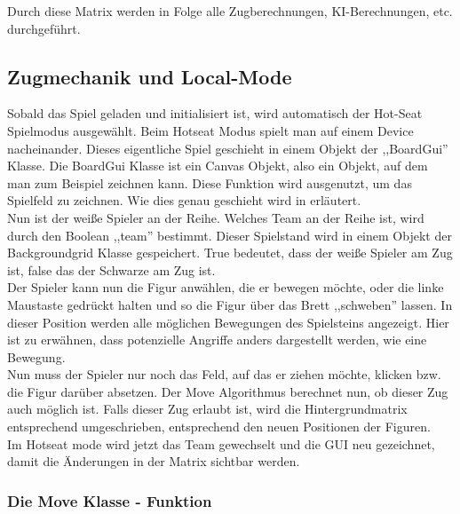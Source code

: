 \documentclass[12pt,a4paper]{article}
\begin{document}
{Durch diese Matrix werden in Folge alle Zugberechnungen, KI-Berechnungen, etc. durchgeführt. \\


\subsection{Zugmechanik und Local-Mode}
\label{SUBSEC:LOCAL_MODE}

Sobald das Spiel geladen und initialisiert ist, wird automatisch der Hot-Seat Spielmodus ausgewählt. Beim Hotseat Modus spielt man auf einem Device nacheinander. Dieses eigentliche Spiel geschieht in einem Objekt der ,,BoardGui'' Klasse. Die BoardGui Klasse ist ein Canvas Objekt, also ein Objekt, auf dem man zum Beispiel zeichnen kann. Diese Funktion wird ausgenutzt, um das Spielfeld zu zeichnen. Wie dies genau geschieht wird in \textbf{ %
 } 
erläutert.  \\
Nun ist der weiße Spieler an der Reihe. Welches Team an der Reihe ist, wird durch den Boolean ,,team'' bestimmt. Dieser Spielstand wird in einem Objekt der Backgroundgrid Klasse gespeichert. True bedeutet, dass der weiße Spieler am Zug ist, false das der Schwarze am Zug ist. \\
Der Spieler kann nun die Figur anwählen, die er bewegen möchte, oder die linke Maustaste gedrückt halten und so die Figur über das Brett ,,schweben'' lassen. In dieser Position werden alle möglichen Bewegungen des Spielsteins angezeigt. Hier ist zu erwähnen, dass potenzielle Angriffe anders dargestellt werden, wie eine Bewegung. \\
Nun muss der Spieler nur noch das Feld, auf das er ziehen möchte, klicken bzw. die Figur darüber absetzen. Der Move Algorithmus berechnet nun, ob dieser Zug auch möglich ist. Falls dieser Zug erlaubt ist, wird die Hintergrundmatrix entsprechend umgeschrieben, entsprechend den neuen Positionen der Figuren. \\
Im Hotseat mode wird jetzt das Team gewechselt und die GUI neu gezeichnet, damit die Änderungen in der Matrix sichtbar werden. 

\subsubsection{Die Move Klasse - Funktion}
\label{SUBSUBSEC:MOVE}

}
\end{document}
